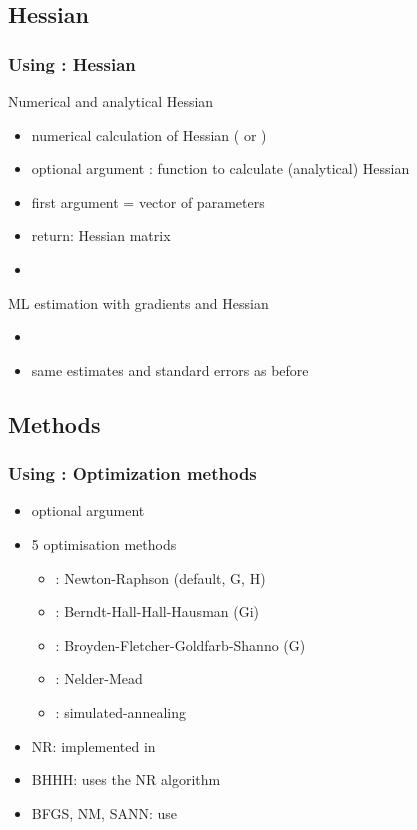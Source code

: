 \documentclass{beamer}
\begin{document}
\subsection{Hessian}
\begin{frame}
\frametitle{Using : Hessian}
Numerical and analytical Hessian
\begin{itemize}
\item numerical calculation of Hessian
   ( or )
\item optional argument :
   function to calculate (analytical) Hessian
\item first argument = vector of parameters
\item return: Hessian matrix
\item {}
\end{itemize}
\vspace*{2ex}
ML estimation with gradients and Hessian
\begin{itemize}
\item {}
\item same estimates and standard errors as before
\end{itemize}
\end{frame}

\subsection{Methods}
\begin{frame}
\frametitle{Using : Optimization methods}
\begin{itemize}
\item optional argument 
\item 5 optimisation methods
   \begin{itemize}
   \item {}: Newton-Raphson (default, G, H)
   \item {}: Berndt-Hall-Hall-Hausman (Gi)
   \item {}: Broyden-Fletcher-Goldfarb-Shanno (G)
   \item {}: Nelder-Mead
   \item {}: simulated-annealing
   \end{itemize}
\item NR: implemented in 
\item BHHH: uses the NR algorithm
\item BFGS, NM, SANN: use 
\end{itemize}
\end{frame}
\end{document}
